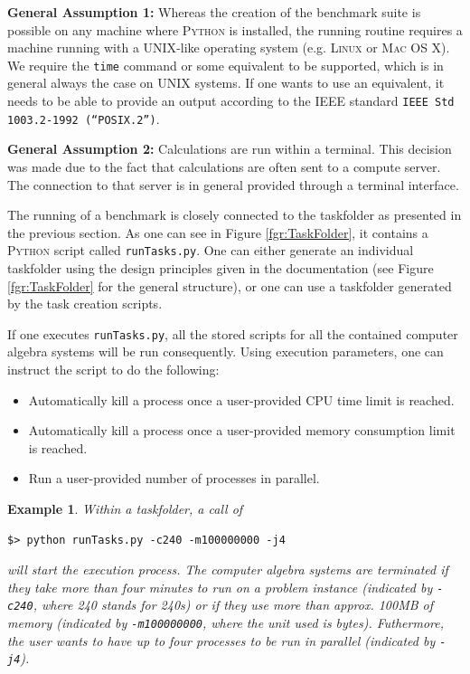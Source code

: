 \documentclass[oribibl,11pt]{article}
\newtheorem{example}{Example}
\begin{document}
\textbf{General Assumption 1:} Whereas the creation of the benchmark
suite is possible on any machine where \textsc{Python} is installed,
the running routine requires a machine running with a
\textsc{UNIX}-like operating system (e.g. \textsc{Linux} or
\textsc{Mac OS X}). We require the \texttt{time} command or some
equivalent to be supported, which is in general always the case on
\textsc{UNIX} systems. If one wants to use an equivalent, it needs
to
 be able to provide an output according to the \textsc{IEEE} standard \texttt{IEEE Std 1003.2-1992 (``POSIX.2'')}.

\noindent\textbf{General Assumption 2:} Calculations are run within a
terminal. This decision was made due to the fact that calculations are
often sent to a compute server. The connection to that server is in
general provided through a terminal interface.


The running of a benchmark is closely connected to the taskfolder as
presented in the previous section. As one can see in Figure
\ref{fgr:TaskFolder}, it contains a \textsc{Python} script called
\texttt{runTasks.py}. One can either generate an individual taskfolder
using the design principles given in the documentation (see Figure
\ref{fgr:TaskFolder} for the general structure), or one can use
a taskfolder generated by the task creation scripts.

If one executes \texttt{runTasks.py}, all the stored scripts for all
the contained computer algebra systems will be run consequently. Using
execution parameters, one can instruct the script to do the following:
\begin{itemize}

\item Automatically kill a process once a user-provided CPU time limit is reached.
\item Automatically kill a process once a user-provided memory consumption limit is reached.
\item Run a user-provided number of processes in parallel.
\end{itemize}
\vspace*{-10pt}
\begin{example}
Within a taskfolder, a call of
\vspace*{-10pt}
{\small{\begin{verbatim}$> python runTasks.py -c240 -m100000000 -j4 
\end{verbatim}}}
\vspace*{-10pt}\noindent will start the execution process. The computer algebra systems are
terminated if they take more than four minutes to run on a problem instance
(indicated by \texttt{-c240}, where 240 stands for 240s) or if they
use more than approx. 100MB of memory (indicated by \texttt{-m100000000}, where
the unit used is bytes). Futhermore, the user wants to have up to four
processes to be run in parallel (indicated by \texttt{-j4}).
\end{example}
\vspace*{-10pt}
\end{document}
